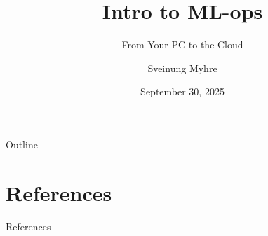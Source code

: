 \documentclass[11pt]{beamer}
\author[Sveinung Myhre]{Sveinung Myhre}
\title{Intro to ML-ops}
\subtitle{From Your PC to the Cloud}
\institute[]{ReLU NTNU}
\date{September 30, 2025}
\begin{document}
\begin{frame}
\titlepage
\end{frame}

\begin{frame}{Outline}
\tableofcontents
\end{frame}








\section{References}
\begin{frame}[allowframebreaks]{References}
    
\end{frame}
\end{document}
